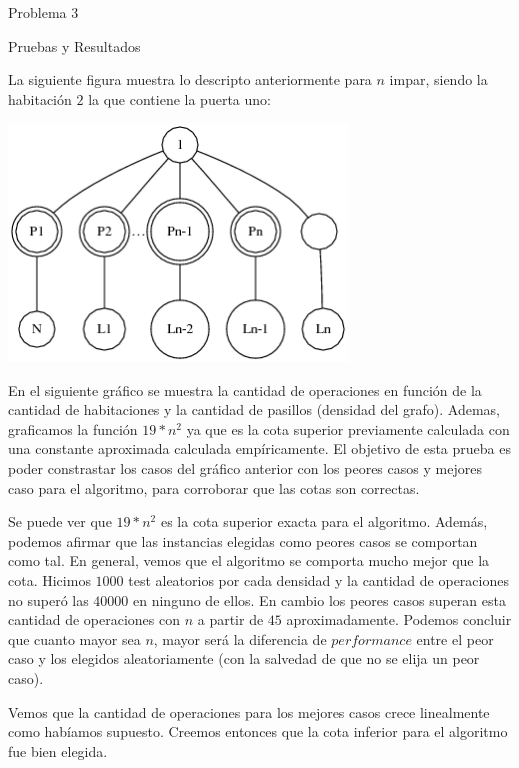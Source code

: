 \begin{section}{Problema 3}
\begin{subsection}{Pruebas y Resultados}
		\newpage

		La siguiente figura muestra lo descripto anteriormente para $n$ impar, siendo la habitación $2$ la que contiene la puerta uno:

		\begin{center}\includegraphics[width=9cm]{prision/peor_caso_impar.png}\end{center}

		\newpage

		En el siguiente gráfico se muestra la cantidad de operaciones en función de la cantidad de habitaciones y la cantidad de pasillos (densidad del grafo). Ademas, graficamos la función $19*n^2$ ya que es la cota superior previamente calculada con una constante aproximada calculada empíricamente. El objetivo de esta prueba es poder constrastar los casos del gráfico anterior con los peores casos y mejores caso para el algoritmo, para corroborar que las cotas son correctas. 
		

		Se puede ver que $19*n^2$ es la cota superior exacta para el algoritmo. Además, podemos afirmar que las instancias elegidas como peores casos se comportan como tal. En general, vemos que el algoritmo se comporta mucho mejor que la cota. Hicimos $1000$ test aleatorios por cada densidad y la cantidad de operaciones no superó las $40000$ en ninguno de ellos. En cambio los peores casos superan esta cantidad de operaciones con $n$ a partir de $45$ aproximadamente. Podemos concluir que cuanto mayor sea $n$, mayor será la diferencia de $performance$ entre el peor caso y los elegidos aleatoriamente (con la salvedad de que no se elija un peor caso).

		Vemos que la cantidad de operaciones para los mejores casos crece linealmente como habíamos supuesto. Creemos entonces que la cota inferior para el algoritmo fue bien elegida.


\end{subsection}
\end{section}
